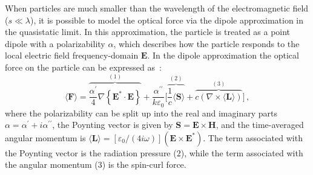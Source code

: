 When particles are much smaller than the wavelength of the electromagnetic field ($s\ll \lambda$), it is possible to model the optical force via the dipole approximation in the
quasistatic limit. In this approximation, the particle is treated as a point dipole with a polarizability $\alpha$, which describes how the particle responds to the local electric field frequency-domain $\mathbf{E}$.
In the dipole approximation the optical force on the particle can be expressed as~\cite{novotny}:
\begin{equation}
    \langle\mathbf{F}\rangle=\overbrace{\frac{\alpha^{\prime}}{4} \nabla\left\{\mathbf{E}^* \cdot \mathbf{E}\right\}}^{(1)}
    +\frac{\alpha^{\prime \prime}}{k \varepsilon_0} \Big[\overbrace{\frac{1}{c}\langle \mathbf{S} \rangle}^{(2)} + \overbrace{c \left( \nabla \times \langle \mathbf{L} \rangle \right)}^{(3)}\Big]\,,
\end{equation}
where the polarizability can be split up into the real and imaginary parts 
$\alpha=\alpha^\prime + i \alpha^{\prime \prime}$, the Poynting vector is given by $\mathbf{S} = \mathbf{E} \times \mathbf{H}$, and the time-averaged angular momentum is 
$\langle \mathbf{L} \rangle = [\varepsilon_0/(4 i \omega)](\mathbf{E} \times \mathbf{E}^*)$. 
The term associated with the Poynting vector is the radiation pressure ($2$), while the term associated 
with the angular momentum ($3$) is the spin-curl force.

